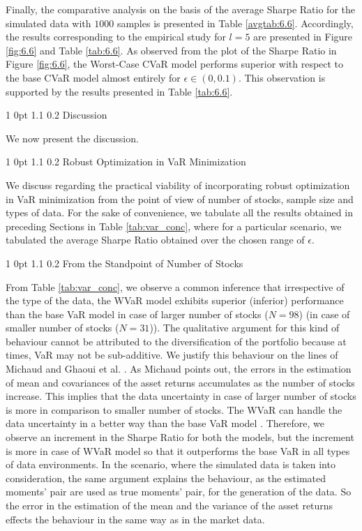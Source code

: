 \documentclass[12pt]{article}
\makeatletter
\numberwithin{equation}{section}
\renewcommand{\section}{
  \@startsection
  {section}%
  {1}%
  {0pt}%
  {1.1\baselineskip}%
  {0.2\baselineskip}%
  {\sc \centering}%
}
\renewcommand{\subsection}{
  \@startsection
  {subsection}%
  {1}%
  {0pt}%
  {1.1\baselineskip}%
  {0.2\baselineskip}%
  {\sc \centering}%
}
\renewcommand{\subsubsection}{
  \@startsection
  {subsubsection}%
  {1}%
  {0pt}%
  {1.1\baselineskip}%
  {0.2\baselineskip}%
  {\sc \centering}%
}
\makeatother
\begin{document}
Finally, the comparative analysis on the basis of the average Sharpe Ratio for the simulated data with $1000$ samples is presented in Table \ref{avgtab:6.6}. Accordingly, the results corresponding to the empirical study for $l=5$ are presented in Figure \ref{fig:6.6} and Table \ref{tab:6.6}. As observed from the plot of the Sharpe Ratio in Figure \ref{fig:6.6}, the Worst-Case CVaR model performs superior with respect to the base CVaR model almost entirely for $\epsilon \in (0,0.1)$. This observation is supported by the results presented in Table \ref{tab:6.6}.

\section{Discussion}
\label{Discussion}

We now present the discussion.

\subsection{Robust Optimization in VaR Minimization}

We discuss regarding the practical viability of incorporating robust optimization in VaR minimization from the point of view of number of stocks, sample size and types of data. For the sake of convenience, we tabulate all the results obtained in preceding Sections in Table \ref{tab:var_conc}, where for a particular scenario, we tabulated the average Sharpe Ratio obtained over the chosen range of $\epsilon$.

\subsubsection{From the Standpoint of Number of Stocks}

From Table \ref{tab:var_conc}, we observe a common inference that irrespective of the type of the data, the WVaR model exhibits superior (inferior) performance than the base VaR model in case of larger number of stocks ($N=98$) (in case of smaller number of stocks ($N=31$)). The qualitative argument for this kind of behaviour cannot be attributed to the diversification of the portfolio because at times, VaR may not be sub-additive. We justify this behaviour on the lines of Michaud \cite{Michaud} and Ghaoui et al. \cite{ghaoui03}. As Michaud points out, the errors in the estimation of mean and covariances of the asset returns accumulates as the number of stocks increase. This implies that the data uncertainty in case of larger number of stocks is more in comparison to smaller number of stocks. The WVaR can handle the data uncertainty in a better way than the base VaR model \cite{ghaoui03}. Therefore, we observe an increment in the Sharpe Ratio for both the models, but the increment is more in case of WVaR model so that it outperforms the base VaR in all types of data environments. In the scenario, where the simulated data is taken into consideration, the same argument explains the behaviour, as the estimated moments' pair are used as true moments' pair, for the generation of the data. So the error in the estimation of the mean and the variance of the asset returns effects the behaviour in the same way as in the market data.
\end{document}
